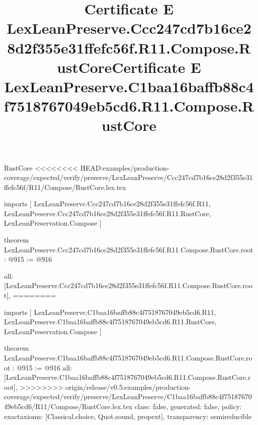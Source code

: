 \begin{lexlean}{RustCore}
<<<<<<<< HEAD:examples/production-coverage/expected/verify/preserve/LexLeanPreserve/Ccc247cd7b16ce28d2f355e31ffefc56f/R11/Compose/RustCore.lex.tex
\title{Certificate E LexLeanPreserve.Ccc247cd7b16ce28d2f355e31ffefc56f.R11.Compose.RustCore}
\begin{coremodule}
imports [
  LexLeanPreserve.Ccc247cd7b16ce28d2f355e31ffefc56f.R11,
  LexLeanPreserve.Ccc247cd7b16ce28d2f355e31ffefc56f.R11.RustCore,
  LexLeanPreservation.Compose
]

theorem LexLeanPreserve.Ccc247cd7b16ce28d2f355e31ffefc56f.R11.Compose.RustCore.root : @915 := @916 {
  all: [LexLeanPreserve.Ccc247cd7b16ce28d2f355e31ffefc56f.R11.Compose.RustCore.root],
========
\title{Certificate E LexLeanPreserve.C1baa16baffb88c4f7518767049eb5cd6.R11.Compose.RustCore}
\begin{coremodule}
imports [
  LexLeanPreserve.C1baa16baffb88c4f7518767049eb5cd6.R11,
  LexLeanPreserve.C1baa16baffb88c4f7518767049eb5cd6.R11.RustCore,
  LexLeanPreservation.Compose
]

theorem LexLeanPreserve.C1baa16baffb88c4f7518767049eb5cd6.R11.Compose.RustCore.root : @915 := @916 {
  all: [LexLeanPreserve.C1baa16baffb88c4f7518767049eb5cd6.R11.Compose.RustCore.root],
>>>>>>>> origin/release/v0.5:examples/production-coverage/expected/verify/preserve/LexLeanPreserve/C1baa16baffb88c4f7518767049eb5cd6/R11/Compose/RustCore.lex.tex
  class: false,
  generated: false,
  policy: exact{axioms: [Classical.choice, Quot.sound, propext]},
  transparency: semireducible
}


\end{coremodule}}
\end{coremodule}
\end{lexlean}
